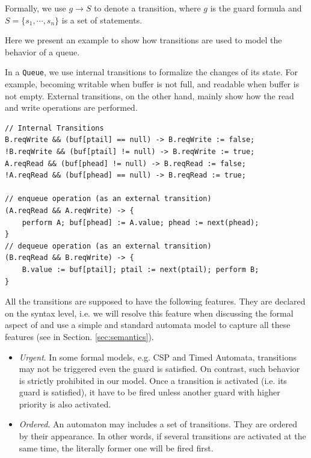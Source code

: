 \begin{formalization}[Transitions]
Formally, we use $g\rightarrow S$ to denote a transition, where $g$ is the guard formula and $S=\{s_1,\cdots,s_n\}$ is a set of statements. 
\end{formalization}

Here we present an example to show how transitions are used to model the behavior of a queue.
\begin{example} In a \texttt{Queue}, we use internal transitions to formalize the changes of its state. For example, becoming writable when buffer is not full, and readable when buffer is not empty. External transitions, on the other hand, mainly show how the read and write operations are performed.
\begin{lstlisting}
// Internal Transitions
B.reqWrite && (buf[ptail] == null) -> B.reqWrite := false;
!B.reqWrite && (buf[ptail] != null) -> B.reqWrite := true;
A.reqRead && (buf[phead] != null) -> B.reqRead := false;
!A.reqRead && (buf[phead] == null) -> B.reqRead := true;

// enqueue operation (as an external transition)
(A.reqRead && A.reqWrite) -> {
    perform A; buf[phead] := A.value; phead := next(phead);
}
// dequeue operation (as an external transition)
(B.reqRead && B.reqWrite) -> {
    B.value := buf[ptail]; ptail := next(ptail); perform B;
}
\end{lstlisting}
\label{exp:trans_queue}
\end{example}

All the transitions are supposed to have the following features. They are declared on the syntax level, i.e. we will resolve this feature when discussing the formal aspect of \lang{} and use a simple and standard automata model to capture all these features (see in Section. \ref{sec:semantics}).

\begin{itemize}
    \item \emph{Urgent}. In some formal models, e.g. CSP\cite{HoareCsp1985} and Timed Automata\cite{AlurTcs1994}, transitions may not be triggered even the guard is satisfied. On contrast, such behavior is strictly prohibited in our model. Once a transition is activated (i.e. its guard is satisfied), it have to be fired unless another guard with higher priority is also activated.
    \item \emph{Ordered}. An automaton may includes a set of transitions. They are ordered by their appearance. In other words, if several transitions are activated at the same time, the literally former one will be fired first.
\end{itemize}

